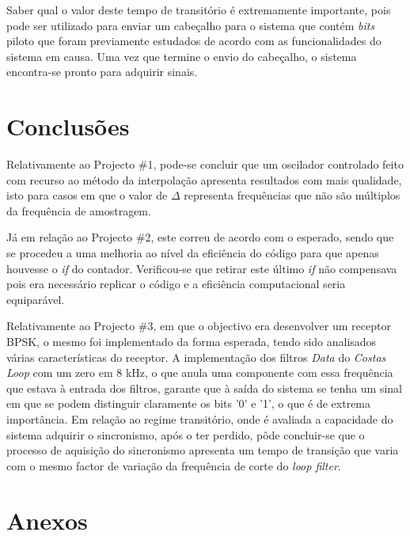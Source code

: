 \documentclass[11pt]{article}
\numberwithin{equation}{section}
\begin{document}
Saber qual o valor deste tempo de transitório é extremamente importante, pois pode ser utilizado para enviar um cabeçalho para o sistema que contém \textit{bits} piloto que foram previamente estudados de acordo com as funcionalidades do sistema em causa. Uma vez que termine o envio do cabeçalho, o sistema encontra-se pronto para adquirir sinais.

\section{Conclusões}

Relativamente ao Projecto \#1, pode-se concluir que um oscilador controlado feito com recurso ao método da interpolação apresenta resultados com mais qualidade, isto para casos em que o valor de $\Delta$ representa frequências que não são múltiplos da frequência de amostragem. 

Já em relação ao Projecto \#2, este correu de acordo com o esperado, sendo que se procedeu a uma melhoria ao nível da eficiência do código para que apenas houvesse o \textit{if} do contador. Verificou-se que retirar este último \textit{if} não compensava pois era necessário replicar o código e a eficiência computacional seria equiparável.

Relativamente ao Projecto \#3, em que o objectivo era desenvolver um receptor BPSK, o mesmo foi implementado da forma esperada, tendo sido analisados várias características do receptor. A implementação dos filtros \textit{Data} do \textit{Costas Loop} com um zero em 8 kHz, o que anula uma componente com essa frequência que estava à entrada dos filtros, garante que à saída do sistema se tenha um sinal em que se podem distinguir claramente os bits '0' e '1', o que é de extrema importância. Em relação ao regime transitório, onde é avaliada a capacidade do sistema adquirir o sincronismo, após o ter perdido, pôde concluir-se que o processo de aquisição do sincronismo apresenta um tempo de transição que varia com o mesmo factor de variação da frequência de corte do \textit{loop filter}. 




\pagebreak

\section{Anexos}
\end{document}
